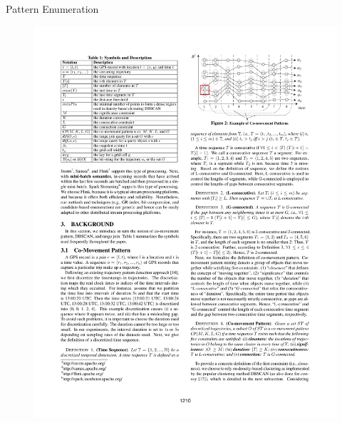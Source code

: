 \documentclass{beamer}
\begin{document}
\begin{frame}{Pattern Enumeration}
    \centering 
    \begin{figure}
        \includegraphics[trim=11cm 21.25cm 2cm 2cm, clip, width=\textwidth]{figures/Chen_p1210}
    \end{figure}
\end{frame}
\end{document}
